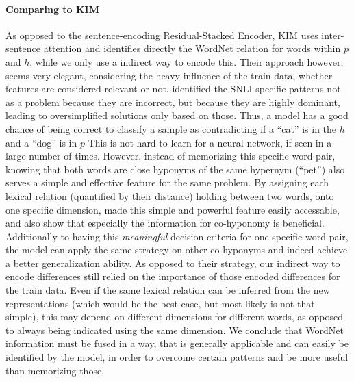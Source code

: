 \paragraph*{Comparing to \ac{KIM}}
As opposed to the sentence-encoding Residual-Stacked Encoder, \ac{KIM} \citep{chen-EtAl:2017b:natural} uses inter-sentence attention and identifies directly the WordNet relation for words within $p$ and $h$, while we only use a indirect way to encode this. Their approach however, seems very elegant, considering the heavy influence of the train data, whether features are considered relevant or not. \cite{gururangan2018annotation} identified the \ac{SNLI}-specific patterns not as a problem because they are incorrect, but because they are highly dominant, leading to oversimplified solutions only based on those. Thus, a model has a good chance of being correct to classify a sample as contradicting if a ``cat'' is in the $h$ and a ``dog'' is in $p$ This is not hard to learn for a neural network, if seen in a large number of times. However, instead of memorizing this specific word-pair, knowing that both words are close hyponyms of the same hypernym (``pet'') also serves a simple and effective feature for the same problem. By assigning each lexical relation (quantified by their distance) holding between two words, onto one specific dimension, \cite{chen-EtAl:2017b:natural} made this simple and powerful feature easily accessable, and also show that especially the information for co-hyponomy is beneficial. Additionally to having this \textit{meaningful} decision criteria for one specific word-pair, the model can apply the same strategy on other co-hyponyms and indeed achieve a better generalization ability. As opposed to their strategy, our indirect way to encode differences still relied on the importance of those encoded differences for the train data. Even if the same lexical relation can be inferred from the new representations (which would be the best case, but most likely is not that simple), this may depend on different dimensions for different words, as opposed to always being indicated using the same dimension. We conclude that WordNet information must be fused in a way, that is generally applicable and can easily be identified by the model, in order to overcome certain patterns and be more useful than memorizing those.